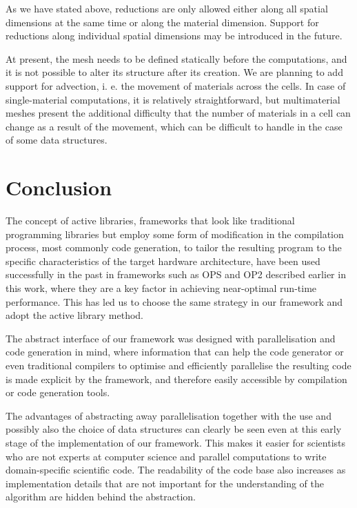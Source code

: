 \documentclass[fontsize=11pt, appendixprefix=true]{scrreprt}
\begin{document}
As we have stated above, reductions are only allowed either along all spatial
dimensions at the same time or along the material dimension. Support for
reductions along individual spatial dimensions may be introduced in the future.

At present, the mesh needs to be defined statically before the computations, and
it is not possible to alter its structure after its creation. We are planning to
add support for advection, i. e. the movement of materials across the cells. In
case of single-material computations, it is relatively straightforward, but
multimaterial meshes present the additional difficulty that the number of
materials in a cell can change as a result of the movement, which can be
difficult to handle in the case of some data structures.

\chapter{Conclusion}

The concept of active libraries, frameworks that look like traditional
programming libraries but employ some form of modification in the compilation
process, most commonly code generation, to tailor the resulting program to the
specific characteristics of the target hardware architecture, have been used
successfully in the past in frameworks such as OPS and OP2 described earlier in
this work, where they are a key factor in achieving near-optimal run-time
performance. This has led us to choose the same strategy in our framework and
adopt the active library method.

The abstract interface of our framework was designed with parallelisation and
code generation in mind, where information that can help the code generator or
even traditional compilers to optimise and efficiently parallelise the resulting
code is made explicit by the framework, and therefore easily accessible by
compilation or code generation tools.

The advantages of abstracting away parallelisation together with the use and
possibly also the choice of data structures can clearly be seen even at this
early stage of the implementation of our framework. This makes it easier for
scientists who are not experts at computer science and parallel computations to
write domain-specific scientific code. The readability of the code base also
increases as implementation details that are not important for the understanding
of the algorithm are hidden behind the abstraction.
\end{document}
